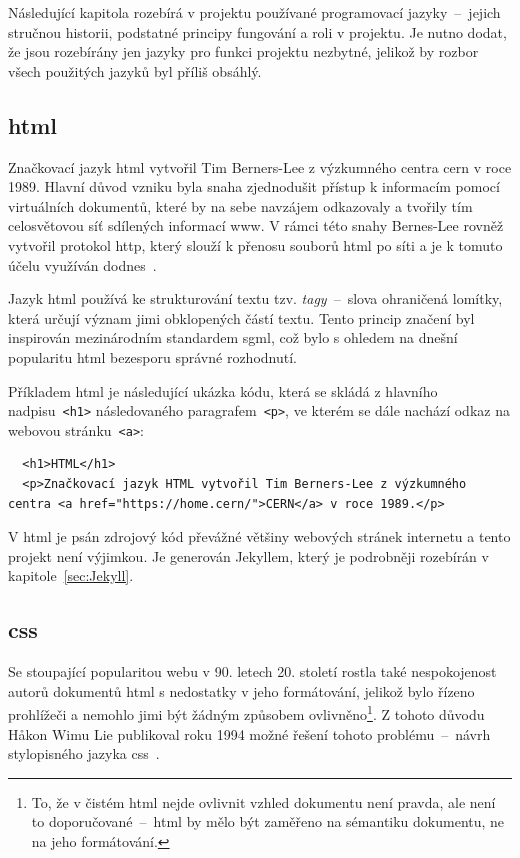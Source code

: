 \documentclass[a4paper, 12pt, twoside]{article}
\begin{document}
  Následující kapitola rozebírá v projektu používané programovací jazyky~--~jejich stručnou historii, podstatné principy fungování a roli v projektu. Je nutno dodat, že jsou rozebírány jen jazyky pro funkci projektu nezbytné, jelikož by rozbor všech použitých jazyků byl příliš obsáhlý.


  \subsection{\acrshort{html}} \label{sec:HTML}
  Značkovací jazyk \gls{html} vytvořil Tim Berners-Lee z výzkumného centra \gls{cern} v roce 1989. Hlavní důvod vzniku byla snaha zjednodušit přístup k informacím pomocí virtuálních dokumentů, které by na sebe navzájem odkazovaly a tvořily tím celosvětovou síť sdílených informací \gls{www}. V rámci této snahy Bernes-Lee rovněž vytvořil protokol \gls{http}, který slouží k přenosu souborů \gls{html} po síti a je k tomuto účelu využíván dodnes~\cite{html-history}.

  Jazyk \gls{html} používá ke strukturování textu tzv. \emph{tagy}~--~slova ohraničená lomítky, která určují význam jimi obklopených částí textu. Tento princip značení byl inspirován mezinárodním standardem \gls{sgml}, což bylo s ohledem na dnešní popularitu \gls{html} bezesporu správné rozhodnutí.

  Příkladem \gls{html} je následující ukázka kódu, která se skládá z hlavního nadpisu~\texttt{<h1>} následovaného paragrafem~\texttt{<p>}, ve kterém se dále nachází odkaz na webovou stránku~\texttt{<a>}:

  \begin{verbatim}
  <h1>HTML</h1>
  <p>Značkovací jazyk HTML vytvořil Tim Berners-Lee z výzkumného centra <a href="https://home.cern/">CERN</a> v roce 1989.</p>
  \end{verbatim}

  V \gls{html} je psán zdrojový kód převážné většiny webových stránek internetu a tento projekt není výjimkou. Je generován Jekyllem, který je podrobněji rozebírán v kapitole~\ref{sec:Jekyll}.


  \subsection{\acrshort{css}} \label{sec:CSS}
  Se stoupající popularitou webu v 90. letech 20. století rostla také nespokojenost autorů dokumentů \gls{html} s nedostatky v jeho formátování, jelikož bylo řízeno prohlížeči a nemohlo jimi být žádným způsobem ovlivněno\footnote{To, že v čistém \gls{html} nejde ovlivnit vzhled dokumentu není pravda, ale není to doporučované~--~\gls{html} by mělo být zaměřeno na sémantiku dokumentu, ne na jeho formátování.}. Z tohoto důvodu Håkon Wimu Lie publikoval roku 1994 možné řešení tohoto problému~--~návrh stylopisného jazyka \gls{css}~\cite{css-proposal,css-saga}.
\end{document}
